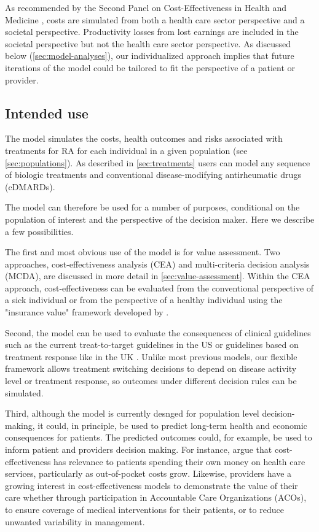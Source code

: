 \documentclass[11pt,final,fleqn]{article}\usepackage[]{graphicx}\usepackage[]{color}
\theoremstyle{plain}
\begin{document}
As recommended by the Second Panel on Cost-Effectiveness in Health and Medicine \citep{sanders2016recommendations}, costs are simulated from both a health care sector perspective and a societal perspective. Productivity losses from lost earnings are included in the societal perspective but not the health care sector perspective. As discussed below (\autoref{sec:model-analyses}), our individualized approach implies that future iterations of the model could be tailored to fit the perspective of a patient or provider.     

\subsection{Intended use}\label{sec:model-analyses}
The model simulates the costs, health outcomes and risks associated with treatments for RA for each individual in a given population (see \autoref{sec:populations}). As described in \autoref{sec:treatments} users can model any sequence of biologic treatments and conventional disease-modifying antirheumatic drugs (cDMARDs). 

The model can therefore be used for a number of purposes, conditional on the population of interest and the perspective of the decision maker. Here we describe a few possibilities. 

The first and most obvious use of the model is for value assessment. Two approaches, cost-effectiveness analysis (CEA) and multi-criteria decision analysis (MCDA), are discussed in more detail in \autoref{sec:value-assessment}. Within the CEA approach, cost-effectiveness can be evaluated from the conventional perspective of a sick individual or from the perspective of a healthy individual using the "insurance value" framework developed by \citet{lakdawalla2017insurance}. 

Second, the model can be used to evaluate the consequences of clinical guidelines such as the current treat-to-target guidelines in the US \citep{singh20162015} or guidelines based on treatment response like in the UK \citep{deighton2010bsr}. Unlike most previous models, our flexible framework allows treatment switching decisions to depend on disease activity level or treatment response, so outcomes under different decision rules can be simulated.   

Third, although the model is currently desnged for population level decision-making, it could, in principle, be used to predict long-term health and economic consequences for patients. The predicted outcomes could, for example, be used to inform patient and providers decision making. For instance, \citet{ioannidis2011individualized} argue that cost-effectiveness has relevance to patients spending their own money on health care services, particularly as out-of-pocket costs grow. Likewise, providers have a growing interest in cost-effectiveness models to demonstrate the value of their care whether through participation in Accountable Care Organizations (ACOs), to ensure coverage of medical interventions for their patients, or to reduce unwanted variability in management. 
\end{document}
